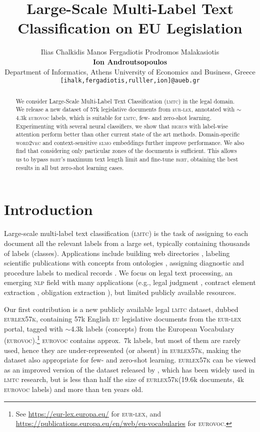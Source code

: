 \documentclass[11pt,a4paper]{article}
\title{Large-Scale Multi-Label Text Classification on EU Legislation}
\author{Ilias Chalkidis \qquad Manos Fergadiotis \qquad Prodromos Malakasiotis \\ \textbf{Ion Androutsopoulos} \\ Department of Informatics, Athens University of Economics and Business, Greece \\ 
{\tt {\normalsize[ihalk,fergadiotis,rulller,ion]@aueb.gr}}}
\date{}
\newcommand{\bigru}{\textsc{bigru}\xspace}
\newcommand{\wordvec}{\textsc{word2vec}\xspace}
\newcommand{\lmtc}{\textsc{lmtc}\xspace}
\newcommand{\elmo}{\textsc{elmo}\xspace}
\newcommand{\bert}{\textsc{bert}\xspace}
\newcommand{\newdata}{\textsc{eurlex57k}\xspace}
\newcommand{\eurovoc}{\textsc{eurovoc}\xspace}
\newcommand{\eu}{\textsc{eu}\xspace}
\newcommand{\eurlex}{\textsc{eur-lex}\xspace}
\begin{document}
\maketitle
\begin{abstract}
We consider Large-Scale Multi-Label Text Classification (\lmtc) in the legal domain. We release a new dataset of 57k legislative documents from \eurlex, annotated with $\mathtt{\sim}$4.3k \eurovoc labels, which is suitable for \lmtc, few- and zero-shot learning. Experimenting with several neural classifiers, we show that \bigru{s} with label-wise attention perform better than other current state of the art methods. Domain-specific \wordvec and context-sensitive \elmo embeddings further improve performance. We also find that considering only particular zones of the documents is sufficient. This allows us to bypass \bert's maximum text length limit and fine-tune \bert, obtaining the best results in all but zero-shot learning cases. 
\end{abstract}

\section{Introduction}
Large-scale multi-label text classification (\lmtc) is the task of assigning to each document all the relevant labels from a large set, typically containing thousands of labels (classes). Applications include building web directories \citep{Partalas2015LSHTCAB}, labeling scientific publications with concepts from ontologies \cite{Tsatsaronis2015}, assigning diagnostic and procedure labels to medical records \cite{Mullenbach2018,Rios2018-2}. We focus on legal text processing, an emerging \textsc{nlp} field with many applications (e.g., legal judgment \cite{Nallapati2008,Aletras2016}, contract element extraction \cite{Chalkidis2017}, obligation extraction \cite{Chalkidis2018b}), but limited publicly available resources.

Our first contribution is a new publicly available legal \lmtc dataset, dubbed \newdata, containing 57k English \eu legislative documents from the \eurlex portal, tagged with $\mathtt{\sim}$4.3k labels (concepts) from the European Vocabulary (\eurovoc).\footnote{See \url{https://eur-lex.europa.eu/} for \eurlex, and \url{https://publications.europa.eu/en/web/eu-vocabularies} for \eurovoc.} \eurovoc contains approx.\ 7k labels, but most of them are rarely used, hence they are under-represented (or  absent) in \newdata, making the dataset also appropriate for few- and zero-shot learning. \newdata can be viewed as an improved version of the dataset released by \citet{Mencia2007}, which has been widely used in \lmtc research, but is less than half the size of \newdata (19.6k documents, 4k \eurovoc labels) and more than ten years old. 
\end{document}
